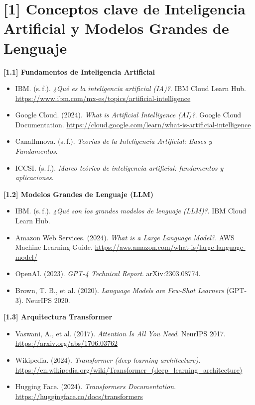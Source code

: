 \documentclass[12pt,a4paper]{report}
\numberwithin{figure}{section}
\begin{document}
\section*{[1] Conceptos clave de Inteligencia Artificial y Modelos Grandes de Lenguaje}
\label{ref:1}

\textbf{[1.1] Fundamentos de Inteligencia Artificial}
\begin{itemize}
  \item IBM. (s.\,f.). \textit{¿Qué es la inteligencia artificial (IA)?}. IBM Cloud Learn Hub. \url{https://www.ibm.com/mx-es/topics/artificial-intelligence}
  \item Google Cloud. (2024). \textit{What is Artificial Intelligence (AI)?}. Google Cloud Documentation. \url{https://cloud.google.com/learn/what-is-artificial-intelligence}
  \item CanalInnova. (s.\,f.). \textit{Teorías de la Inteligencia Artificial: Bases y Fundamentos}.
  \item ICCSI. (s.\,f.). \textit{Marco teórico de inteligencia artificial: fundamentos y aplicaciones}.
\end{itemize}

\textbf{[1.2] Modelos Grandes de Lenguaje (LLM)}
\begin{itemize}
  \item IBM. (s.\,f.). \textit{¿Qué son los grandes modelos de lenguaje (LLM)?}. IBM Cloud Learn Hub.
  \item Amazon Web Services. (2024). \textit{What is a Large Language Model?}. AWS Machine Learning Guide. \url{https://aws.amazon.com/what-is/large-language-model/}
  \item OpenAI. (2023). \textit{GPT-4 Technical Report}. arXiv:2303.08774.
  \item Brown, T. B., et al. (2020). \textit{Language Models are Few-Shot Learners} (GPT-3). NeurIPS 2020.
\end{itemize}

\textbf{[1.3] Arquitectura Transformer}
\begin{itemize}
  \item Vaswani, A., et al. (2017). \textit{Attention Is All You Need}. NeurIPS 2017. \url{https://arxiv.org/abs/1706.03762}
  \item Wikipedia. (2024). \textit{Transformer (deep learning architecture)}. \url{https://en.wikipedia.org/wiki/Transformer_(deep_learning_architecture)}
  \item Hugging Face. (2024). \textit{Transformers Documentation}. \url{https://huggingface.co/docs/transformers}
\end{itemize}
\end{document}
